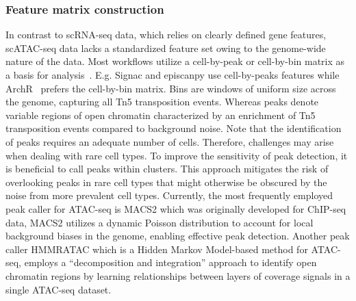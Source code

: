\subsubsection{Feature matrix construction} 
In contrast to scRNA-seq data, which relies on clearly defined gene features, scATAC-seq data lacks a standardized feature set owing to the genome-wide nature of the data. Most workflows utilize a cell-by-peak or cell-by-bin matrix as a basis for analysis~\citep{heumos2023best}. E.g. Signac\citep{signac} and episcanpy\citep{Danese2021episcanpy} use cell-by-peaks features while ArchR~\citep{Granja2021} prefers the cell-by-bin matrix. Bins are windows of uniform size across the genome, capturing all Tn5 transposition events. Whereas peaks denote variable regions of open chromatin characterized by an enrichment of Tn5 transposition events compared to background noise. Note that the identification of peaks requires an adequate number of cells. Therefore, challenges may arise when dealing with rare cell types. To improve the sensitivity of peak detection, it is beneficial to call peaks within clusters. This approach mitigates the risk of overlooking peaks in rare cell types that might otherwise be obscured by the noise from more prevalent cell types. Currently, the most frequently employed peak caller for ATAC-seq is MACS2 \citep{zhang2008macs2} which was originally developed for ChIP-seq data, MACS2 utilizes a dynamic Poisson distribution to account for local background biases in the genome, enabling effective peak detection. Another peak caller HMMRATAC \citep{tarbell2019hmmratac} which is a Hidden Markov Model-based method for ATAC-seq, employs a ``decomposition and integration'' approach to identify open chromatin regions by learning relationships between layers of coverage signals in a single ATAC-seq dataset. 

